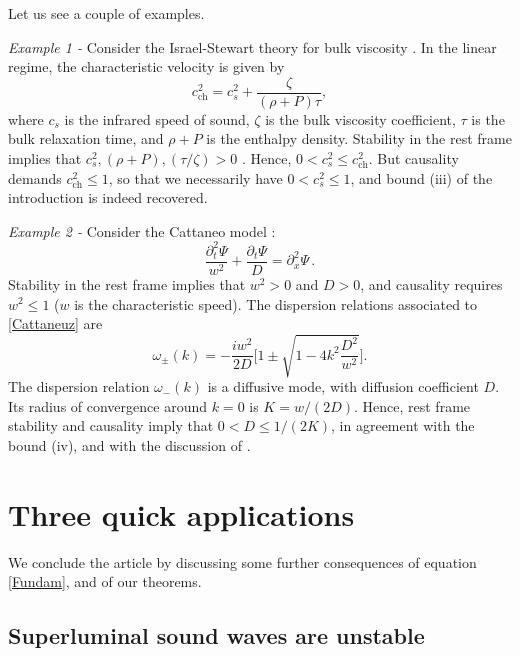 \documentclass[a4paper, amsfonts, amssymb, amsmath, reprint, showkeys, nofootinbib, twoside,notitlepage]{revtex4-1}
\theoremstyle{definition}
\theoremstyle{theorem}
\theoremstyle{corollary}
\begin{document}
Let us see a couple of examples.

\textit{Example 1 -} Consider the Israel-Stewart theory for bulk viscosity \cite{Israel_Stewart_1979,Hishcock1983,Salmonson1991,
BulkGavassino}. In the linear regime, the characteristic velocity is given by \cite{Causality_bulk}
\begin{equation}
c_{\text{ch}}^2 = c_s^2 + \dfrac{\zeta}{(\rho+P)\tau}  ,
\end{equation}
where $c_s$ is the infrared speed of sound, $\zeta$ is the bulk viscosity coefficient, $\tau$ is the bulk relaxation time, and $\rho+P$ is the enthalpy density. Stability in the rest frame implies that $c_s^2,(\rho+P),(\tau/\zeta)>0$ \cite{Hishcock1983,GavassinoGibbs2021}. Hence, $0 < c_s^2 \leq c_{\text{ch}}^2$. But causality demands $c_{\text{ch}}^2 \leq 1$, so that we necessarily have $0 < c_s^2 \leq 1$, and bound (iii) of the introduction is indeed recovered.

\textit{Example 2 -} Consider the Cattaneo model \cite{cattaneo1958,rezzolla_book,
GavassinoCausality2021}:
\begin{equation}\label{Cattaneuz}
\dfrac{\partial^2_t \Psi}{w^2}+\dfrac{\partial_t \Psi}{D} = \partial^2_x \Psi \, .
\end{equation}
Stability in the rest frame implies that $w^2>0$ and $D>0$, and causality requires $w^2 \leq 1$ ($w$ is the characteristic speed). The dispersion relations associated to \eqref{Cattaneuz} are 
\begin{equation}\label{cattuzdisp}
\omega_\pm(k) =- \dfrac{iw^2}{2D} \bigg[ 1 \pm  \sqrt{1-4k^2 \dfrac{D^2}{w^2} } \bigg] .
\end{equation}
The dispersion relation $\omega_-(k)$ is a diffusive mode, with diffusion coefficient $D$. Its radius of convergence around $k=0$ is $K=w/(2D)$. Hence, rest frame stability and causality imply that $0 < D \leq 1/(2K)$, in agreement with the bound (iv), and with the discussion of \cite{Heller2022}.

\section{Three quick applications}

We conclude the article by discussing some further consequences of equation \eqref{Fundam}, and of our theorems.

\subsection{Superluminal sound waves are unstable}
\end{document}
